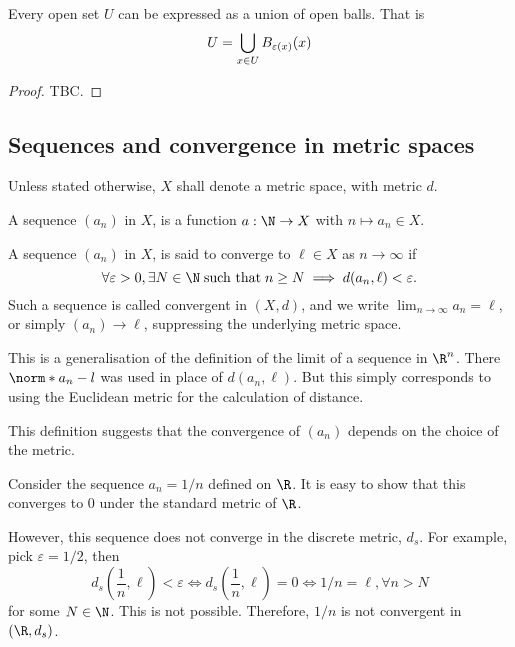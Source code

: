 \begin{nthm}
  Every open set $U$ can be expressed as a union of open balls. That is
  \begin{equation*}
    U = \bigcup_{x \in U} B_{\varepsilon(x)}(x)
  \end{equation*}
\end{nthm}
\begin{proof}
  TBC.
\end{proof}

\subsection{Sequences and convergence in metric spaces}
Unless stated otherwise, $X$ shall denote a metric space, with metric $d$.

\begin{ndfn}[Sequence]
  A sequence $(a_n)$ in $X$, is a function $a:\N \to X$ with $n \mapsto a_n \in X$.
\end{ndfn}

\begin{ndfn}[Convergence]
  A sequence $(a_n)$ in $X$, is said to converge to $\ell \in X$ as $n \to \infty$ if
  \begin{equation*}
    \forall \varepsilon > 0, \exists N \in \N\;\text{such that}\;n \geq N \implies d(a_n, \ell) < \varepsilon.
  \end{equation*}
  Such a sequence is called convergent in $(X,d)$, and we write $\lim_{n\to\infty} a_n = \ell$, or simply $(a_n) \to \ell$, suppressing the underlying metric space.
\end{ndfn}

This is a generalisation of the definition of the limit of a sequence in $\R^n$. There $\norm*{a_n - l}$ was used in place of $d(a_n, \ell)$. But this simply corresponds to using the Euclidean metric for the calculation of distance.

This definition suggests that the convergence of $(a_n)$ depends on the choice of the metric.
\begin{negg}
  Consider the sequence $a_n = 1/n$ defined on $\R$. It is easy to show that this converges to $0$ under the standard metric of $\R$.

  However, this sequence does not converge in the discrete metric, $d_s$. For example, pick $\varepsilon = 1/2$, then
  \begin{equation*}
    d_s\left(\frac{1}{n},\ell\right) < \varepsilon \iff d_s\left(\frac{1}{n},\ell\right) = 0 \iff 1/n = \ell, \forall n>N
  \end{equation*}
  for some $N \in \N$. This is not possible. Therefore, $1/n$ is not convergent in $(\R, d_s)$.\eggqed
\end{negg}

